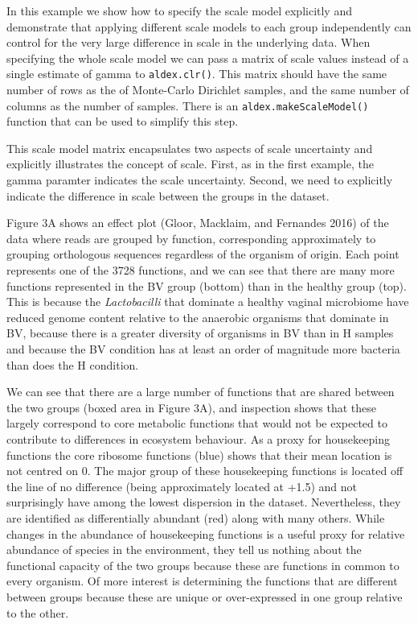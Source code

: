 \documentclass[
]{article}
\begin{document}
In this example we show how to specify the scale model explicitly and
demonstrate that applying different scale models to each group
independently can control for the very large difference in scale in the
underlying data. When specifying the whole scale model we can pass a
matrix of scale values instead of a single estimate of gamma to
\texttt{aldex.clr()}. This matrix should have the same number of rows as
the of Monte-Carlo Dirichlet samples, and the same number of columns as
the number of samples. There is an \texttt{aldex.makeScaleModel()}
function that can be used to simplify this step.

This scale model matrix encapsulates two aspects of scale uncertainty
and explicitly illustrates the concept of scale. First, as in the first
example, the gamma paramter indicates the scale uncertainty. Second, we
need to explicitly indicate the difference in scale between the groups
in the dataset.

Figure 3A shows an effect plot (Gloor, Macklaim, and Fernandes 2016) of
the data where reads are grouped by function, corresponding
approximately to grouping orthologous sequences regardless of the
organism of origin. Each point represents one of the 3728 functions, and
we can see that there are many more functions represented in the BV
group (bottom) than in the healthy group (top). This is because the
\textit{Lactobacilli} that dominate a healthy vaginal microbiome have
reduced genome content relative to the anaerobic organisms that dominate
in BV, because there is a greater diversity of organisms in BV than in H
samples and because the BV condition has at least an order of magnitude
more bacteria than does the H condition.

We can see that there are a large number of functions that are shared
between the two groups (boxed area in Figure 3A), and inspection shows
that these largely correspond to core metabolic functions that would not
be expected to contribute to differences in ecosystem behaviour. As a
proxy for housekeeping functions the core ribosome functions (blue)
shows that their mean location is not centred on 0. The major group of
these housekeeping functions is located off the line of no difference
(being approximately located at +1.5) and not surprisingly have among
the lowest dispersion in the dataset. Nevertheless, they are identified
as differentially abundant (red) along with many others. While changes
in the abundance of housekeeping functions is a useful proxy for
relative abundance of species in the environment, they tell us nothing
about the functional capacity of the two groups because these are
functions in common to every organism. Of more interest is determining
the functions that are different between groups because these are unique
or over-expressed in one group relative to the other.
\end{document}
